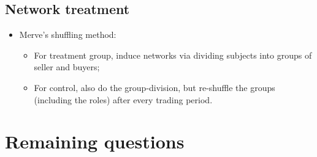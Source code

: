 \subsection{Network treatment}

\begin{itemize}
    \item Merve's shuffling method:
        \begin{itemize}
            \item For treatment group, induce networks via dividing subjects into groups
            of seller and buyers;
            \item For control, also do the group-division, but re-shuffle the groups
            (including the roles) after every trading period.
        \end{itemize}
\end{itemize}


\section{Remaining questions}
